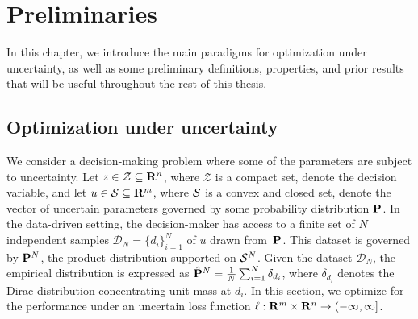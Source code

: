 \chapter{Preliminaries}
\label{chap:prelim}


In this chapter, we introduce the main paradigms for optimization under uncertainty, as well as some preliminary definitions, properties, and prior results that will be useful throughout the rest of this thesis. 
\section{Optimization under uncertainty}
\label{sec:opt_under_unc}
We consider a decision-making problem where some of the parameters are subject to uncertainty.
Let $z \in \mathcal{Z} \subseteq {\mathbf R}^n$, where $\mathcal{Z}$ is a compact set, denote the decision variable, and let $u \in \mathcal{S} \subseteq {\mathbf R}^m$, where $\mathcal{S}$ is a convex and closed set, denote the vector of uncertain parameters governed by some probability distribution ${\mathbf P}$.
In the data-driven setting, the decision-maker has access to a finite set of $N$ independent samples $\mathcal{D}_N = \{d_i\}_{i=1}^N$ of $u$ drawn from~${\mathbf P}$. This dataset is governed by ${\mathbf P}^N$, the product distribution supported on $\mathcal{S}^{N}$.
Given the dataset $\mathcal{D}_N$, the empirical distribution is expressed as $\hat{{\mathbf P}}^N = \frac{1}{N}\sum_{i=1}^N \delta_{d_i}$, where $\delta_{d_i}$ denotes the Dirac distribution concentrating unit mass at $d_i$.
In this section, we optimize for the performance under an uncertain loss function $\ell: {\mathbf R}^m \times {\mathbf R}^n \rightarrow (-\infty, \infty]$.


